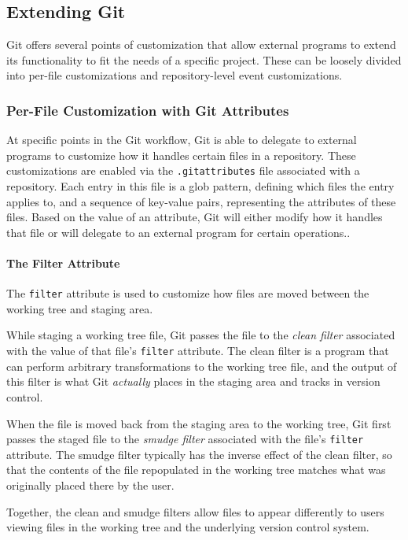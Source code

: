 \documentclass[nohyperref]{article}
\def\code#1{\texttt{#1}}
\theoremstyle{plain}
\theoremstyle{definition}
\theoremstyle{remark}
\newcommand{\brian}[1]{\textcolor{Plum}{\bf\small [\textsc{brian}:~#1]}}
\begin{document}
\subsection{Extending Git} \label{ssec:extending_git}
Git offers several points of customization that allow external programs to extend its functionality to fit the needs of a specific project. These can be loosely divided into per-file customizations and repository-level event customizations.

\subsubsection{Per-File Customization with Git Attributes}
At specific points in the Git workflow, Git is able to delegate to external programs to customize how it handles certain files in a repository. 
These customizations are enabled via the \code{.gitattributes} file associated with a repository. Each entry in this file is a glob pattern, defining which files the entry applies to, and a sequence of key-value pairs, representing the attributes of these files. Based on the value of an attribute, Git will either modify how it handles that file or will delegate to an external program for certain operations.. 


\paragraph{The Filter Attribute}
The \code{filter} attribute is used to customize how files are moved between the working tree and staging area.

While staging a working tree file, Git passes the file to the \emph{clean filter} associated with the value of that file's \code{filter} attribute. The clean filter is a program that can perform arbitrary transformations to the working tree file, and the output of this filter is what Git \emph{actually} places in the staging area and tracks in version control.

When the file is moved back from the staging area to the working tree, Git first passes the staged file to the \emph{smudge filter} associated with the file's \code{filter} attribute. The smudge filter typically has the inverse effect of the clean filter, so that the contents of the file repopulated in the working tree matches what was originally placed there by the user.

Together, the clean and smudge filters allow files to appear differently to users viewing files in the working tree and the underlying version control system.
\end{document}
